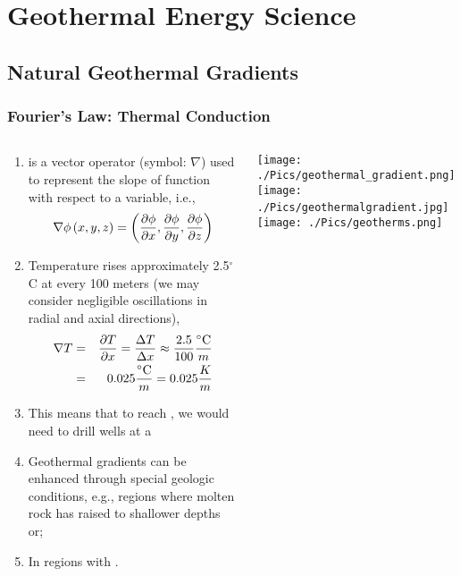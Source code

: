 \documentclass[10pt,compress,unknownkeysallowed]{beamer}
\begin{document}
 \section{Geothermal Energy Science}

\subsection{Natural Geothermal Gradients}

\begin{frame}
 \frametitle{Fourier's Law: Thermal Conduction}
  \begin{columns}
   \begin{column}[c]{0.45\linewidth}
    \begin{enumerate}[1.] \scriptsize
       \item <1->  is a vector operator (symbol: $\nabla$) used to represent the slope of function with respect to a variable, i.e., 
          \begin{displaymath}
             \nabla \phi \left(x, y, z\right) = \left( \displaystyle\frac{\partial \phi}{\partial x}, \displaystyle\frac{\partial \phi}{\partial y}, \displaystyle\frac{\partial \phi}{\partial z}\right)
          \end{displaymath} 
       \item <2-> Temperature rises approximately 2.5$^{\circ}$C at every 100 meters (we may consider negligible oscillations in radial and axial directions),
          \begin{eqnarray}
             \nabla T  &=& \displaystyle\frac{\partial T}{\partial x} = \displaystyle\frac{\Delta T}{\Delta x} \approx \displaystyle\frac{2.5}{100} \displaystyle\frac{^{\circ}\text{C}}{m}  \nonumber \\
                       &=& 0.025 \displaystyle\frac{^{\circ}\text{C}}{m} = 0.025 \displaystyle\frac{K}{m} \nonumber
          \end{eqnarray} 
       \item <3-> This means that to reach , we would need to drill wells at a 
       \item <4-> Geothermal gradients can be enhanced through special geologic conditions, e.g., regions where molten rock has raised to shallower depths or;
       \item <4-> In regions with .
    \end{enumerate}
   \end{column}
   \begin{column}[c]{0.55\linewidth}
     \vbox{
        \hbox{\hspace{1cm}\texttt{[image: ./Pics/geothermal\_gradient.png]}}
        \hbox{\texttt{[image: ./Pics/geothermalgradient.jpg]}
              \texttt{[image: ./Pics/geotherms.png]}}
     }
   \end{column}  
  \end{columns}
\end{frame}
\end{document}
